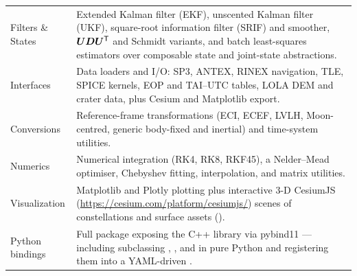 \begin{table}[H]
\begin{tabularx}{\textwidth}{@{}lL@{}}
    Filters \& States &
      Extended Kalman filter (EKF), unscented Kalman filter (UKF), square-root
      information filter (SRIF) and smoother, $\bm{U}\bm{D}\bm{U}^{\mathsf{T}}$
      and Schmidt
      variants, and batch least-squares estimators over composable state and
      joint-state abstractions. \\
    Interfaces &
      Data loaders and I/O: SP3, ANTEX, RINEX navigation, TLE, SPICE kernels,
      EOP and TAI--UTC tables, LOLA DEM and crater data, plus Cesium and
      Matplotlib export. \\
    Conversions &
      Reference-frame transformations (ECI, ECEF, LVLH, Moon-centred, generic
      body-fixed and inertial) and time-system utilities. \\
    Numerics &
      Numerical integration (RK4, RK8, RKF45), a Nelder--Mead optimiser,
      Chebyshev fitting, interpolation, and matrix utilities. \\
    Visualization &
      Matplotlib and Plotly plotting plus interactive 3-D CesiumJS
      (\url{https://cesium.com/platform/cesiumjs/}) scenes of constellations
      and surface assets (). \\
    Python bindings &
      Full \pylupnt{} package exposing the C++ library via pybind11 ---
      including subclassing , , and
       in pure Python and registering them into a YAML-driven
      . \\
    \bottomrule
  \end{tabularx}
\end{table}

